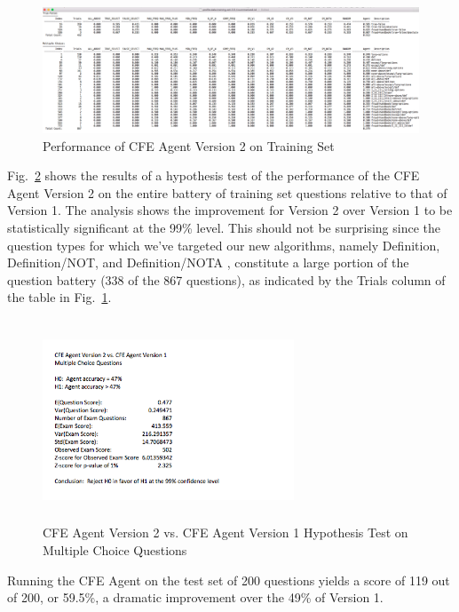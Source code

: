 \begin{figure}
\centering
\vspace{0.25in}
\includegraphics[width=\textwidth]{version_2_training_set_performance.png}
\caption{Performance of CFE Agent Version 2 on Training Set}
\label{fig:version_2_training_set_performance}
\end{figure}

Fig.~\ref{fig:version_2_multiple_choice_hypothesis_test} shows the results of a hypothesis test of the performance of the CFE Agent Version 2 on the entire battery of training set questions relative to that of Version 1.  The analysis shows the improvement for Version 2 over Version 1 to be statistically significant at the 99\% level.  This should not be surprising since the question types for which we've targeted our new algorithms, namely Definition, Definition/NOT, and Definition/NOTA , constitute a large portion of the question battery (338 of the 867 questions), as indicated by the Trials column of the table in Fig.~\ref{fig:version_2_training_set_performance}.

\begin{figure}
\centering
\vspace{0.75in}
\includegraphics[width=75mm, height=60mm]{version_2_multiple_choice_hypothesis_test.png}
\caption{CFE Agent Version 2 vs. CFE Agent Version 1 Hypothesis Test on Multiple Choice Questions}
\label{fig:version_2_multiple_choice_hypothesis_test}
\end{figure}

Running the CFE Agent on the test set of 200 questions yields a score of 119 out of 200, or 59.5\%, a dramatic improvement over the 49\% of Version 1.

















